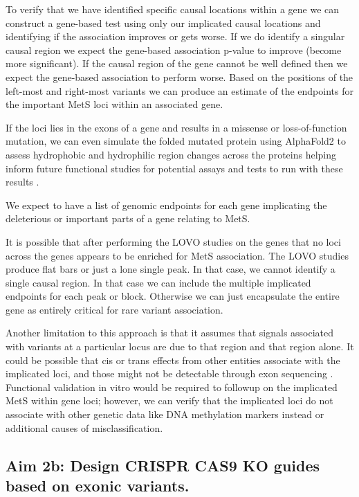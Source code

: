 \documentclass[11pt]{article}
\begin{document}
To verify that we have identified specific causal locations within a gene we can construct a gene-based test using only our implicated causal locations and identifying if the association improves or gets worse. If we do identify a singular causal region we expect the gene-based association p-value to improve (become more significant). If the causal region of the gene cannot be well defined then we expect the gene-based association to perform worse. Based on the positions of the left-most and right-most variants we can produce an estimate of the endpoints for the important MetS loci within an associated gene.

If the loci lies in the exons of a gene and results in a missense or loss-of-function mutation, we can even simulate the folded mutated protein using AlphaFold2 to assess hydrophobic and hydrophilic region changes across the proteins helping inform future functional studies for potential assays and tests to run with these results \cite{Tunyasuvunakool2021-ql}.

We expect to have a list of genomic endpoints for each gene implicating the deleterious or important parts of a gene relating to MetS. 

\noindent {}

It is possible that after performing the LOVO studies on the genes that no loci across the genes appears to be enriched for MetS association. The LOVO studies produce flat bars or just a lone single peak. In that case, we cannot identify a single causal region. In that case we can include the multiple implicated endpoints for each peak or block. Otherwise we can just encapsulate the entire gene as entirely critical for rare variant association.

Another limitation to this approach is that it assumes that signals associated with variants at a particular locus are due to that region and that region alone. It could be possible that cis or trans effects from other entities associate with the implicated loci, and those might not be detectable through exon sequencing \cite{Vosa2021-tg}. Functional validation in vitro would be required to followup on the implicated MetS within gene loci; however, we can verify that the implicated loci do not associate with other genetic data like DNA methylation markers instead or additional causes of misclassification.

\subsection*{Aim 2b: Design CRISPR CAS9 KO guides based on exonic variants.} 
\end{document}

